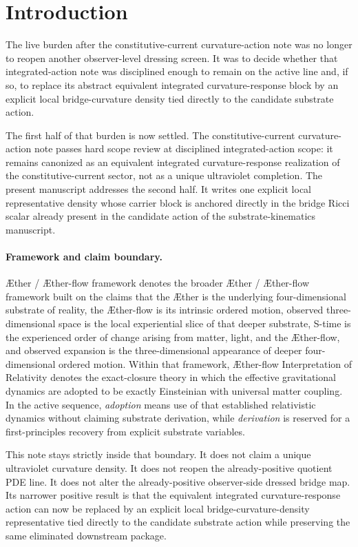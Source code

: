 \documentclass[11pt]{article}
\newcommand{\Aether}{\AE{}ther}
\newcommand{\Aflow}{\AE{}ther-flow}
\newcommand{\TheoryName}{\Aflow{} Interpretation of Relativity}
\newcommand{\TheoryProgram}{\Aether{} / \Aflow{} framework}
\begin{document}
\section{Introduction}

The live burden after the constitutive-current curvature-action note was no longer to reopen another observer-level dressing screen. It was to decide whether that integrated-action note was disciplined enough to remain on the active line and, if so, to replace its abstract equivalent integrated curvature-response block by an explicit local bridge-curvature density tied directly to the candidate substrate action.

The first half of that burden is now settled. The constitutive-current curvature-action note passes hard scope review at disciplined integrated-action scope: it remains canonized as an equivalent integrated curvature-response realization of the constitutive-current sector, not as a unique ultraviolet completion. The present manuscript addresses the second half. It writes one explicit local representative density whose carrier block is anchored directly in the bridge Ricci scalar already present in the candidate action of the substrate-kinematics manuscript.

\paragraph{Framework and claim boundary.}
\TheoryProgram{} denotes the broader \Aether{} / \Aflow{} framework built on the claims that the \Aether{} is the underlying four-dimensional substrate of reality, the \Aflow{} is its intrinsic ordered motion, observed three-dimensional space is the local experiential slice of that deeper substrate, S-time is the experienced order of change arising from matter, light, and the \Aflow{}, and observed expansion is the three-dimensional appearance of deeper four-dimensional ordered motion. Within that framework, \TheoryName{} denotes the exact-closure theory in which the effective gravitational dynamics are adopted to be exactly Einsteinian with universal matter coupling. In the active sequence, \emph{adoption} means use of that established relativistic dynamics without claiming substrate derivation, while \emph{derivation} is reserved for a first-principles recovery from explicit substrate variables.

This note stays strictly inside that boundary. It does not claim a unique ultraviolet curvature density. It does not reopen the already-positive quotient PDE line. It does not alter the already-positive observer-side dressed bridge map. Its narrower positive result is that the equivalent integrated curvature-response action can now be replaced by an explicit local bridge-curvature-density representative tied directly to the candidate substrate action while preserving the same eliminated downstream package.
\end{document}
